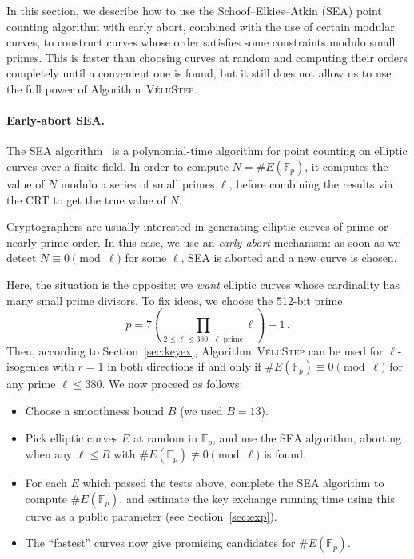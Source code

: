 \documentclass{llncs}
\newcommand{\F}{\mathbb{F}}
\newcommand{\algstyle}[1]{\textsc{#1}}
\begin{document}
In this section, we describe how to use the Schoof--Elkies--Atkin (SEA) point counting
algorithm with early abort, combined with the use of certain modular curves,
to construct curves whose order satisfies some constraints
modulo small primes.
This is faster than choosing curves at random and computing their orders
completely until a convenient one is found, but it still does not allow us
to use the full power of Algorithm~\algstyle{VéluStep}.

\paragraph{Early-abort SEA.}
The SEA algorithm~\cite{schoof95,Morain95}
is a polynomial-time algorithm for
point counting on elliptic curves over a finite field. In order to compute
$N = \# E(\F_p)$, it computes the value of $N$ modulo a series
of small primes $\ell$, before combining the results via the CRT
to get the true value of $N$.

Cryptographers are usually interested in generating elliptic curves of
prime or nearly prime order. In this case, we use an \emph{early-abort}
mechanism: as soon as we detect $N \equiv 0\pmod{\ell}$ for some $\ell$,
SEA is aborted and a new curve is chosen.

Here, the situation is the opposite: we \emph{want} elliptic curves
whose cardinality has many small prime divisors.
To fix ideas, we choose the 512-bit prime
\[
    p 
    = 
    7 \left(
        \prod_{2\leq\ell\leq 380,\ \ell \text{ prime}} \ell
    \right) - 1
    \,.
\]
Then, according to Section~\ref{sec:keyex}, Algorithm~\algstyle{VéluStep} can be used
for $\ell$-isogenies with $r=1$ in both directions if and only if
$\# E(\F_p) \equiv0\pmod{\ell}$ for any prime $\ell\leq 380$.
We now proceed as follows:
\begin{itemize}
    \item 
        Choose a smoothness bound $B$ (we used $B = 13$).
    \item 
        Pick elliptic curves $E$ at random in $\F_p$, and use the SEA algorithm,
        aborting when any $\ell\leq B$ 
        with $\#E(\F_p) \not\equiv 0\pmod{\ell}$ is found.
    \item 
        For each $E$ which passed the tests above, 
        complete the SEA algorithm to compute $\#E(\F_p)$, 
        and estimate the key exchange running time 
        using this curve as a public parameter (see Section~\ref{sec:exp}).
    \item
        The ``fastest'' curves now give promising candidates for $\#E(\F_p)$.
\end{itemize}
\end{document}
